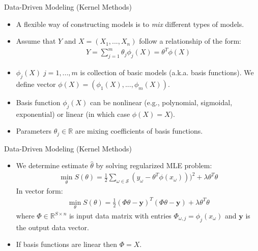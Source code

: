 \documentclass[9pt]{beamer}
\begin{document}
\begin{frame}{Data-Driven Modeling (Kernel Methods)}
\begin{itemize}
\item A flexible way of constructing models is to {\em mix} different types of models.  
\item Assume that $Y$ and $X=(X_1,...,X_n)$ follow a relationship of the form:
\begin{align*}
Y=\sum_{j=1}^m\theta_j \phi_j(X)=\theta^T\phi(X)
\end{align*}
\item $\phi_j(X)\; j=1,...,m$ is collection of basic models (a.k.a. basis functions). We define vector $\phi(X)=(\phi_1(X),...,\phi_m(X))$. 
\item Basis function $\phi_j(X)$ can be nonlinear (e.g., polynomial, sigmoidal, exponential) or linear (in which case $\phi(X)=X$). 

\item Parameters $\theta_j\in \mathbb{R}$ are mixing coefficients of basis functions.  

\end{itemize}

\end{frame}


\begin{frame}{Data-Driven Modeling (Kernel Methods)}
\begin{itemize}

\item We determine estimate $\hat{\theta}$ by solving regularized MLE problem:
\begin{align*}
\min_{\theta} S(\theta)= \frac{1}{2}\sum_{\omega \in \mathcal{S}}(y_\omega-\theta^T\phi(x_\omega)))^2+\lambda \theta^T\theta
\end{align*}
In vector form:
\begin{align*}
\min_{\theta} S(\theta)= \frac{1}{2}(\Phi\theta -\mathbf{y})^T(\Phi\theta-\mathbf{y})+\lambda\theta^T\theta
\end{align*}
where $\Phi\in \mathbb{R}^{S\times n}$ is input data matrix with entries $\Phi_{\omega,j}=\phi_{j}(x_\omega)$ and $\mathbf{y}$ is the output data vector. 

\item If basis functions are linear then $\Phi=X$. 

\end{itemize}

\end{frame}
\end{document}
